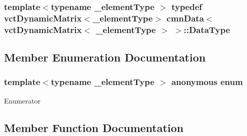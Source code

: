 \subsubsection[{Data\+Type}]{\setlength{\rightskip}{0pt plus 5cm}template$<$typename \+\_\+element\+Type $>$ typedef {\bf vct\+Dynamic\+Matrix}$<$\+\_\+element\+Type$>$ {\bf cmn\+Data}$<$ {\bf vct\+Dynamic\+Matrix}$<$ \+\_\+element\+Type $>$ $>$\+::{\bf Data\+Type}}\label{classcmn_data_3_01vct_dynamic_matrix_3_01__element_type_01_4_01_4_aac077247ac3ce4c624c4636509abe930}


\subsection{Member Enumeration Documentation}
\hypertarget{classcmn_data_3_01vct_dynamic_matrix_3_01__element_type_01_4_01_4_aef8d134adbdf78f3bda65daf485c2bd6}{}\subsubsection[{anonymous enum}]{\setlength{\rightskip}{0pt plus 5cm}template$<$typename \+\_\+element\+Type $>$ anonymous enum}\label{classcmn_data_3_01vct_dynamic_matrix_3_01__element_type_01_4_01_4_aef8d134adbdf78f3bda65daf485c2bd6}
\begin{Desc}
\item[Enumerator]\par
\begin{description}
\item[{\em 
\hypertarget{classcmn_data_3_01vct_dynamic_matrix_3_01__element_type_01_4_01_4_aef8d134adbdf78f3bda65daf485c2bd6abf692d4df8b5d1c66f90c50c64a9edc8}{}I\+S\+\_\+\+S\+P\+E\+C\+I\+A\+L\+I\+Z\+E\+D\label{classcmn_data_3_01vct_dynamic_matrix_3_01__element_type_01_4_01_4_aef8d134adbdf78f3bda65daf485c2bd6abf692d4df8b5d1c66f90c50c64a9edc8}
}]\end{description}
\end{Desc}


\subsection{Member Function Documentation}
\hypertarget{classcmn_data_3_01vct_dynamic_matrix_3_01__element_type_01_4_01_4_aeb810ce558573cd7565f917e0602279c}{}
